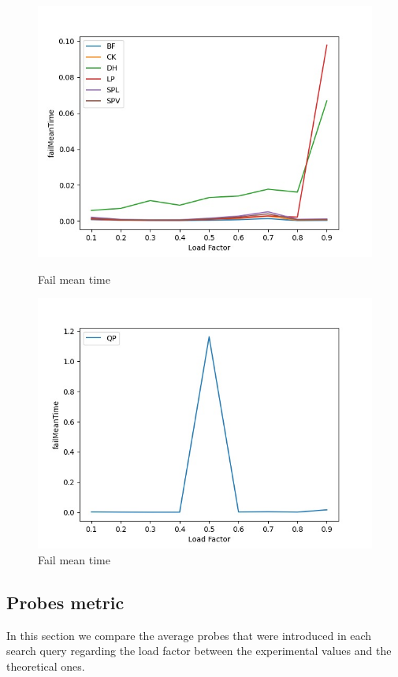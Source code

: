 \documentclass{article}
\begin{document}
        \begin{figure}[!h]
          \includegraphics[width=\linewidth]{images/loadFactor_vs_failMeanTime.jpeg}
          \caption{Fail mean time}\label{fig:plot2}
        \endminipage\hfill
          \includegraphics[width=\linewidth]{images/loadFactor_vs_failMeanTimeQP.jpeg}
          \caption{Fail mean time}\label{fig:plot3}
        \endminipage
        \end{figure}
    
    
    \subsection*{Probes metric}
    In this section we compare the average probes that were introduced in each search query regarding the load factor between the experimental values and the theoretical ones.
    
\end{document}
